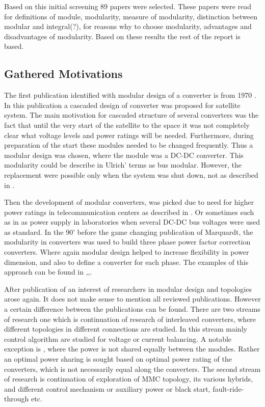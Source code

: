 \documentclass[]{scrartcl}
\begin{document}
Based on this initial screening 89 papers were selected. These papers were read for definitions of module, modularity, measure of modularity, distinction between modular and integral(?), for reasons why to choose modularity, advantages and disadvantages of modularity.  Based on these results the rest of the report is based.

\subsection{Gathered Motivations}

The first publication identified with modular design of a converter is from 1970 \cite{Landsman1970}. In this publication a cascaded design of converter was proposed for satellite system. The main motivation for cascaded structure of several converters was the fact that until the very start of the satellite to the space it was not completely clear what voltage levels and power ratings will be needed. Furthermore, during preparation of the start these modules needed to be changed frequently. Thus a modular design was chosen, where the module was a DC-DC converter. This modularity could be describe in Ulrich' terms as bus modular. However, the replacement were possible only when the system was shut down, not as described in \cite{Cottet2015}.

Then the development of modular converters, was picked due to need for higher power ratings in telecommunication centers as described in \cite{Nuechteriein}.  Or sometimes such as in \cite{Bishop} as power supply in laboratories when several DC-DC bus voltages were used as standard.  In the 90' before the game changing publication of Marquardt, the modularity in converters was used to build three phase power factor correction converters. Where again modular design helped to increase flexibility in power dimension, and also to define a converter for each phase. The examples of this approach can be found in \cite{Ho1998},\cite{Hui},\cite{Ho2000}.

After publication of \cite{Marquardt2002} an interest of researchers in modular design and topologies arose again. It does not make sense to mention all reviewed publications. However a certain difference between the publications can be found. There are two streams of research one which is continuation of research of interleaved converters, where different topologies in different connections are studied. In this stream mainly control algorithm are studied for voltage or current balancing. A notable exception is \cite{Dc-dc2016}, where the power is not shared equally between the modules. Rather an optimal power sharing is sought based on optimal power rating of the converters, which is not necessarily equal along the converters. The second stream of research is continuation of exploration of MMC topology, its various hybrids, and different control mechanism or auxiliary power or black start, fault-ride-through etc.
\end{document}
